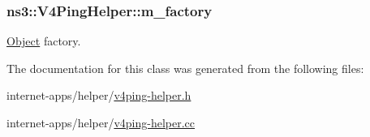 \subsubsection[{\texorpdfstring{m\+\_\+factory}{m_factory}}]{ ns3\+::\+V4\+Ping\+Helper\+::m\+\_\+factory\hspace{0.3cm}{\ttfamily [private]}}\hypertarget{classns3_1_1V4PingHelper_a33fad67853c8c148e08929f37deb2212}{}\label{classns3_1_1V4PingHelper_a33fad67853c8c148e08929f37deb2212}


\hyperlink{classns3_1_1Object}{Object} factory. 



The documentation for this class was generated from the following files\+:\begin{DoxyCompactItemize}
\item 
internet-\/apps/helper/\hyperlink{v4ping-helper_8h}{v4ping-\/helper.\+h}\item 
internet-\/apps/helper/\hyperlink{v4ping-helper_8cc}{v4ping-\/helper.\+cc}\end{DoxyCompactItemize}
